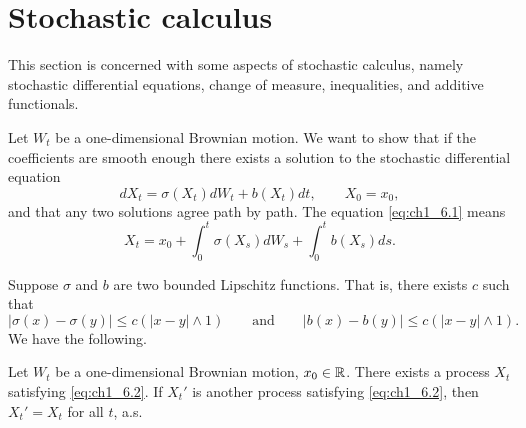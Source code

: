 \section{Stochastic calculus}\label{ch1_sec6}

This section is concerned with some aspects of stochastic calculus, namely stochastic differential equations, change of measure, inequalities, and additive functionals.


Let $W_t$ be a one-dimensional Brownian motion. We want to show that if the coefficients are smooth enough there exists a solution to the stochastic differential equation
\begin{equation}\label{eq:ch1_6.1}
    dX_t = \sigma(X_t)dW_t + b(X_t)dt, \qquad X_0 = x_0,
\end{equation}
and that any two solutions agree path by path. The equation \eqref{eq:ch1_6.1} means
\begin{equation}\label{eq:ch1_6.2}
    X_t = x_0 + \int_0^t \sigma(X_s)dW_s + \int_0^t b(X_s)ds.
\end{equation}

Suppose $\sigma$ and $b$ are two bounded Lipschitz functions. That is, there exists $c$ such that
\begin{equation}\label{eq:ch1_6.3}
    |\sigma(x)-\sigma(y)| \leq c(|x-y|\wedge 1) \qquad \text{and} \qquad |b(x)-b(y)| \leq c(|x-y|\wedge 1).
\end{equation}
We have the following.

\begin{theorem}\label{thm:ch1_6.1}
Let $W_t$ be a one-dimensional Brownian motion, $x_0 \in \mathbb{R}$. There exists a process $X_t$ satisfying \eqref{eq:ch1_6.2}. If $X_t'$ is another process satisfying \eqref{eq:ch1_6.2}, then $X_t' = X_t$ for all $t$, a.s.
\end{theorem}


